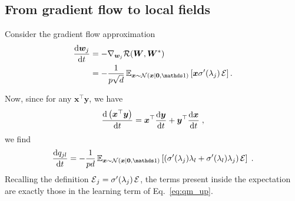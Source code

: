 \subsection{From gradient flow to local fields}
\label{app:c:flow}
Consider the gradient flow approximation
\begin{align*}
    \dv{\w_j}{t}  &= -\nabla_{\w_j}\risk(\W, \W^*)\\
    &= - \frac1{p\sqrt{d}}\Expxgauss\left[ \x \act'(\lf_j ) \Er \right].
\end{align*}

Now, since for any $\bm{x}^{\top}\bm{y}$, we have
\begin{equation}
    \nonumber
    \dv{\left(\bm{x}^{\top}\bm{y}\right)}{t}  =  \bm{x}^{\top} \dv{\bm{y}}{t} + \bm{y}^{\top} \dv{\bm{x}}{t} \;,
\end{equation}
we find
\begin{equation}
    \nonumber
\dv{\q_{jl}}{t}   = -\frac{1}{pd} \Expxgauss\left[ \left(\act'(\lf_j)  \lf_l + \act'(\lf_l) \lf_j \right) \Er \right] \;.
\end{equation}
Recalling the definition $\operatorname{{\cal E}}_j = \sigma'(\lambda_j)\operatorname{{\cal E}}$, the terms present inside the expectation are exactly those in the learning term of Eq.~\eqref{eq:qm_up}. 

